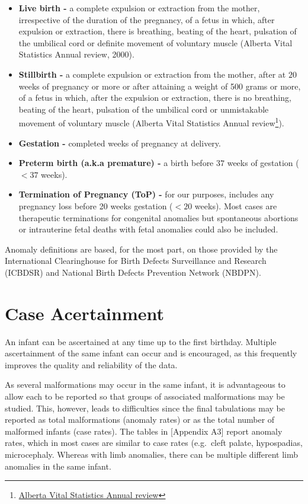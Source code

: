 \documentclass[
]{krantz}
\begin{document}
\begin{itemize}
\item
  \textbf{Live birth -} a complete expulsion or extraction from the mother, irrespective of the duration of the pregnancy, of a fetus in which, after expulsion or extraction, there is breathing, beating of the heart, pulsation of the umbilical cord or definite movement of voluntary muscle (Alberta Vital Statistics Annual review, 2000).
\item
  \textbf{Stillbirth -} a complete expulsion or extraction from the mother, after at \(20\) weeks of pregnancy or more or after attaining a weight of 500 grams or more, of a fetus in which, after the expulsion or extraction, there is no breathing, beating of the heart, pulsation of the umbilical cord or unmistakable movement of voluntary muscle (Alberta Vital Statistics Annual review\footnote{ \href{https://open.alberta.ca/publications/1485-3809}{Alberta Vital Statistics Annual review}}).
\item
  \textbf{Gestation -} completed weeks of pregnancy at delivery.
\item
  \textbf{Preterm birth (a.k.a premature) -} a birth before \(37\) weeks of gestation (\(< 37\) weeks).
\item
  \textbf{Termination of Pregnancy (ToP) -} for our purposes, includes any pregnancy loss before 20 weeks gestation (\(< 20\) weeks). Most cases are therapeutic terminations for congenital anomalies but spontaneous abortions or intrauterine fetal deaths with fetal anomalies could also be included.
\end{itemize}

Anomaly definitions are based, for the most part, on those provided by the International Clearinghouse for Birth Defects Surveillance and Research (ICBDSR) and National Birth Defects Prevention Network (NBDPN).

\hypertarget{section12}{%
\section{Case Acertainment}\label{section12}}

An infant can be ascertained at any time up to the first birthday. Multiple ascertainment of the same infant can occur and is encouraged, as this frequently improves the quality and reliability of the data.

As several malformations may occur in the same infant, it is advantageous to allow each to be reported so that groups of associated malformations may be studied. This, however, leads to difficulties since the final tabulations may be reported as total malformations (anomaly rates) or as the total number of malformed infants (case rates). The tables in {[}Appendix A3{]} report anomaly rates, which in most cases are similar to case rates (e.g.~cleft palate, hypospadias, microcephaly. Whereas with limb anomalies, there can be multiple different limb anomalies in the same infant.
\end{document}
